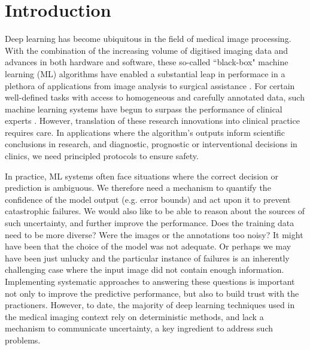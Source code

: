 \chapter{Introduction}
\label{chapter:intro}

Deep learning \cite{lecun2015deep} has become ubiquitous in the field of medical image processing. With the combination of the increasing volume of digitised imaging data and advances in both hardware and software,  these so-called ``black-box" machine learning (ML) algorithms have enabled a substantial leap in performace in a plethora of applications from image analysis to surgical assistance \cite{litjens2017survey,shen2017deep}. For certain well-defined tasks with access to homogeneous and carefully annotated data, such machine learning systems have begun to surpass the performance of clinical experts \cite{esteva2017dermatologist,gulshan2016development,rajpurkar2017chexnet,wu2019deep}. However, translation of these research innovations into clinical practice requires care. In applications where the algorithm's outputs inform scientific conclusions in research, and diagnostic, prognostic or interventional decisions in clinics, we need principled protocols to ensure safety. 

In practice, ML systems often face situations where the correct decision or prediction is ambiguous. We therefore need a mechanism to quantify the confidence of the model output (e.g. error bounds) and act upon it to prevent catastrophic failures. We would also like to be able to reason about the sources of such uncertainty, and further improve the performance. Does the training data need to be more diverse? Were the images or the annotations too noisy? It might have been that the choice of the model was not adequate. Or perhaps we may have been just unlucky and the particular instance of failures is an inherently challenging case where the input image did not contain enough information. Implementing systematic approaches to answering these questions is important not only to improve the predictive performance, but also to build trust with the practioners. However, to date, the majority of deep learning techniques used in the medical imaging context rely on deterministic methods, and lack a mechanism to communicate uncertainty, a key ingredient to address such problems. 

